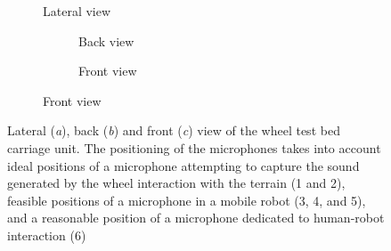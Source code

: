 \begin{figure}
    \begin{subfigure}{.57\linewidth}
        \centering
        
        \caption{Lateral view}
        \label{fig:wheeltestbed-setup-2-lateral}
    \end{subfigure}
    \hfill
    \begin{subfigure}{.40\linewidth}
        \begin{subfigure}{\linewidth}
            \centering
            
            \caption{Back view}
            \label{fig:wheeltestbed-setup-2-back}
        \end{subfigure}
        \bigskip
        
        \begin{subfigure}{\linewidth}
            \centering
            
            \caption{Front view}
            \label{fig:wheeltestbed-setup-2-front}
        \end{subfigure}
    \end{subfigure}
    \caption{Lateral (\emph{a}), back (\emph{b}) and front (\emph{c}) view of
    the wheel test bed carriage unit. The positioning of the microphones takes
    into account ideal positions of a microphone attempting to capture the
    sound generated by the wheel interaction with the terrain (1 and 2),
    feasible positions of a microphone in a mobile robot (3, 4, and 5), and a
    reasonable position of a microphone dedicated to human-robot interaction
    (6)}
    \label{fig:wheeltestbed-setup-2}
\end{figure}



